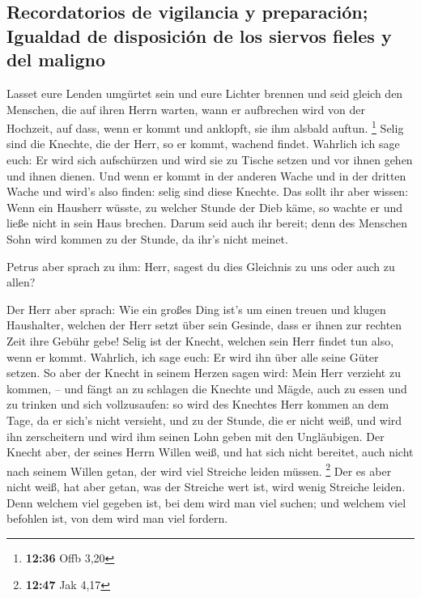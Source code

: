 \hypertarget{recordatorios-de-vigilancia-y-preparaciuxf3n-igualdad-de-disposiciuxf3n-de-los-siervos-fieles-y-del-maligno}{%
\subsection{Recordatorios de vigilancia y preparación; Igualdad de
disposición de los siervos fieles y del
maligno}\label{recordatorios-de-vigilancia-y-preparaciuxf3n-igualdad-de-disposiciuxf3n-de-los-siervos-fieles-y-del-maligno}}

 Lasset eure Lenden umgürtet sein und eure Lichter
brennen  und seid gleich den Menschen, die auf ihren
Herrn warten, wann er aufbrechen wird von der Hochzeit, auf dass, wenn
er kommt und anklopft, sie ihm alsbald auftun. \footnote{\textbf{12:36}
  Offb 3,20}  Selig sind die Knechte, die der Herr, so er
kommt, wachend findet. Wahrlich ich sage euch: Er wird sich aufschürzen
und wird sie zu Tische setzen und vor ihnen gehen und ihnen dienen.
 Und wenn er kommt in der anderen Wache und in der
dritten Wache und wird's also finden: selig sind diese Knechte.
 Das sollt ihr aber wissen: Wenn ein Hausherr wüsste, zu
welcher Stunde der Dieb käme, so wachte er und ließe nicht in sein Haus
brechen.  Darum seid auch ihr bereit; denn des Menschen
Sohn wird kommen zu der Stunde, da ihr's nicht meinet.

 Petrus aber sprach zu ihm: Herr, sagest du dies
Gleichnis zu uns oder auch zu allen?

 Der Herr aber sprach: Wie ein großes Ding ist's um einen
treuen und klugen Haushalter, welchen der Herr setzt über sein Gesinde,
dass er ihnen zur rechten Zeit ihre Gebühr gebe!  Selig
ist der Knecht, welchen sein Herr findet tun also, wenn er kommt.
 Wahrlich, ich sage euch: Er wird ihn über alle seine
Güter setzen.  So aber der Knecht in seinem Herzen sagen
wird: Mein Herr verzieht zu kommen, -- und fängt an zu schlagen die
Knechte und Mägde, auch zu essen und zu trinken und sich vollzusaufen:
 so wird des Knechtes Herr kommen an dem Tage, da er
sich's nicht versieht, und zu der Stunde, die er nicht weiß, und wird
ihn zerscheitern und wird ihm seinen Lohn geben mit den Ungläubigen.
 Der Knecht aber, der seines Herrn Willen weiß, und hat
sich nicht bereitet, auch nicht nach seinem Willen getan, der wird viel
Streiche leiden müssen. \footnote{\textbf{12:47} Jak 4,17}
 Der es aber nicht weiß, hat aber getan, was der Streiche
wert ist, wird wenig Streiche leiden. Denn welchem viel gegeben ist, bei
dem wird man viel suchen; und welchem viel befohlen ist, von dem wird
man viel fordern.

